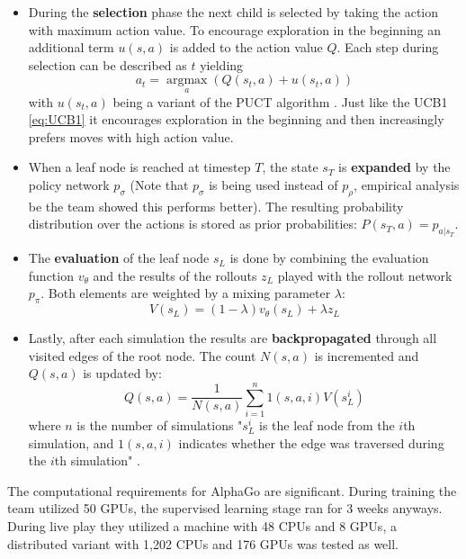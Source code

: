 \begin{itemize}
    \item During the \textbf{selection} phase the next child is selected by taking the action with maximum action value. To encourage exploration in the beginning an additional term $u(s,a)$ is added to the action value $Q$. Each step during selection can be described as $t$ yielding
          \begin{equation}
              a_t = \operatorname*{argmax}_a (Q(s_t,a) + u(s_t, a))
          \end{equation}
          with $u(s_t, a)$ being a variant of the PUCT algorithm \cite{rosin_multi-armed_2011}. Just like the UCB1 \ref{eq:UCB1} it encourages exploration in the beginning and then increasingly prefers moves with high action value.
    \item When a leaf node is reached at timestep $T$, the state $s_T$ is \textbf{expanded} by the policy network $p_{\sigma}$ (Note that $p_{\sigma}$ is being used instead of $p_{\rho}$, empirical analysis be the team showed this performs better). The resulting probability distribution over the actions is stored as prior probabilities: $P(s_T, a) = p_{a|s_T}$.
    \item The \textbf{evaluation} of the leaf node $s_L$ is done by combining the evaluation function $v_{\theta}$ and the results of the rollouts $z_L$ played with the rollout network $p_{\pi}$. Both elements are weighted by a mixing parameter $\lambda$:
          \begin{equation}
              V(s_L) = (1 - \lambda)v_{\theta}(s_L) + \lambda z_L
          \end{equation}
    \item Lastly, after each simulation the results are \textbf{backpropagated} through all visited edges of the root node. The count $N(s,a)$ is incremented and $Q(s,a)$ is updated by:
          \begin{equation}
              Q(s,a) = \frac{1}{N(s,a)}\sum_{i=1}^{n}1(s,a,i)V(s_L^i)
          \end{equation}
          where $n$ is the number of simulations "$s_L^i$ is the leaf node from the $i$th simulation, and $1(s,a,i)$ indicates whether the edge was traversed during the $i$th simulation" \cite[p. 529]{silver_mastering_2016}.
\end{itemize}

The computational requirements for AlphaGo are significant. During training the team utilized 50 GPUs, the supervised learning stage ran for 3 weeks anyways. During live play they utilized a machine with 48 CPUs and 8 GPUs, a distributed variant with 1,202 CPUs and 176 GPUs was tested as well.

